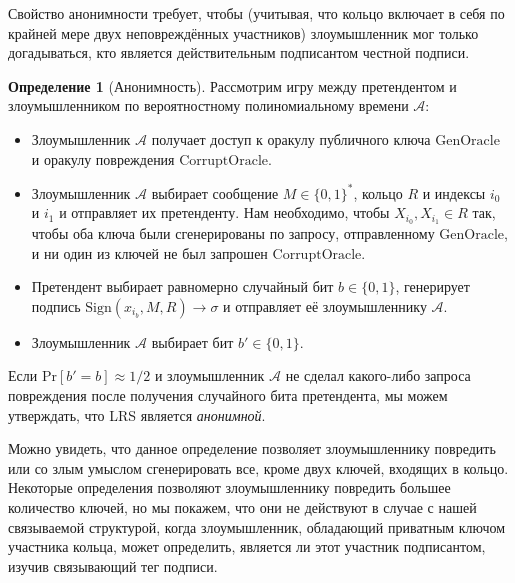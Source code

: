 \documentclass{article}
\newcommand{\A}{\mathcal{A}}
\theoremstyle{definition}
\newtheorem{definition}{Определение}
\begin{document}
Свойство анонимности требует, чтобы (учитывая, что кольцо включает в себя по крайней мере двух неповреждённых участников) злоумышленник мог только догадываться, кто является действительным подписантом честной подписи.
\begin{definition}[Анонимность]
Рассмотрим игру между претендентом и злоумышленником по вероятностному полиномиальному времени $\A$:
\begin{itemize}
\item Злоумышленник $\A$ получает доступ к оракулу публичного ключа $\text{GenOracle}$ и оракулу повреждения $\text{CorruptOracle}$.
\item Злоумышленник $\A$ выбирает сообщение $M \in \{0,1\}^*$, кольцо $R$ и индексы $i_0$ и $i_1$ и отправляет их претенденту.
Нам необходимо, чтобы $X_{i_0},X_{i_1} \in R$ так, чтобы оба ключа были сгенерированы по запросу, отправленному $\text{GenOracle}$, и ни один из ключей не был запрошен $\text{CorruptOracle}$.
\item Претендент выбирает равномерно случайный бит $b \in \{0,1\}$, генерирует подпись $\text{Sign}(x_{i_b},M,R) \to \sigma$ и отправляет её злоумышленнику $\A$.
\item Злоумышленник $\A$ выбирает бит $b' \in \{0,1\}$.
\end{itemize}
Если $\text{Pr}[ b' = b ] \approx 1/2$ и злоумышленник $\A$ не сделал какого-либо запроса повреждения после получения случайного бита претендента, мы можем утверждать, что LRS является \textit{анонимной}.
\end{definition}
Можно увидеть, что данное определение позволяет злоумышленнику повредить или со злым умыслом сгенерировать все, кроме двух ключей, входящих в кольцо.
Некоторые определения позволяют злоумышленнику повредить большее количество ключей, но мы покажем, что они не действуют в случае с нашей связываемой структурой, когда злоумышленник, обладающий приватным ключом участника кольца, может определить, является ли этот участник подписантом, изучив связывающий тег подписи.
\end{document}
